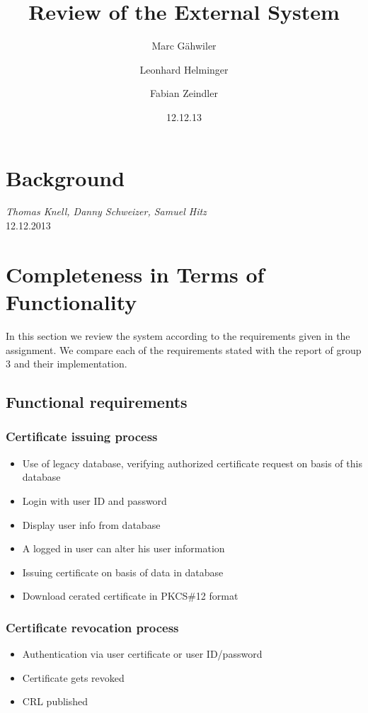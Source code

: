 \documentclass{article}
\title{\huge\sffamily\bfseries Review of the External System}
\author{Marc G\"ahwiler \and Leonhard Helminger \and Fabian Zeindler}
\date{12.12.13}
\begin{document}
\maketitle

\tableofcontents
\pagebreak

\section{Background}

 {\it Thomas Knell, Danny Schweizer, Samuel Hitz} \\

 12.12.2013

\section{Completeness in Terms of Functionality} 
In this section we review the system according to the requirements given in the assignment. We compare each of the requirements stated with the report of group 3 and their implementation.
\subsection{Functional requirements}
\subsubsection{Certificate issuing process}
\begin{itemize}
\item Use of legacy database, verifying authorized certificate request on basis of this database \checkmark 
\item Login with user ID and password \checkmark
\item Display user info from database \checkmark
\item A logged in user can alter his user information \checkmark
\item Issuing certificate on basis of data in database \checkmark
\item Download cerated certificate in PKCS\#12 format \checkmark
\end{itemize}
\subsubsection{Certificate revocation process}
\begin{itemize}
\item Authentication via user certificate or user ID/password \checkmark
\item Certificate gets revoked \checkmark
\item CRL published \checkmark
\end{itemize}
\end{document}

